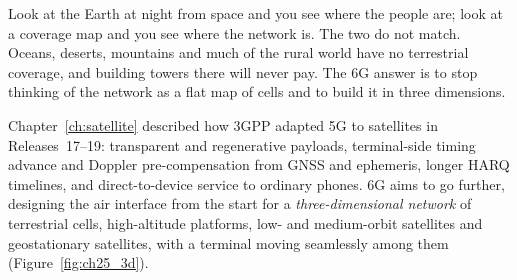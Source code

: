 Look at the Earth at night from space and you see where the people are; look at a coverage map and
you see where the network is. The two do not match. Oceans, deserts, mountains and much of the
rural world have no terrestrial coverage, and building towers there will never pay. The 6G answer is
to stop thinking of the network as a flat map of cells and to build it in three dimensions.

Chapter~\ref{ch:satellite} described how 3GPP adapted 5G to satellites in Releases~17--19:
transparent and regenerative payloads, terminal-side timing advance and Doppler pre-compensation from
GNSS and ephemeris, longer HARQ timelines, and direct-to-device service to ordinary phones. 6G aims
to go further, designing the air interface from the start for a \emph{three-dimensional network} of
terrestrial cells, high-altitude platforms, low- and medium-orbit satellites and geostationary
satellites, with a terminal moving seamlessly among them (Figure~\ref{fig:ch25_3d}).

